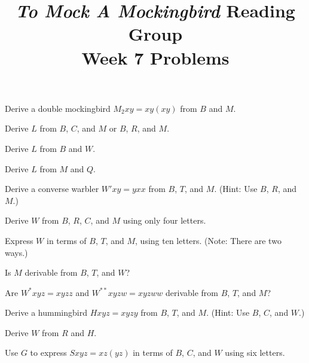 \documentclass[12pt, letterpaper]{article}
\title{\emph{To Mock A Mockingbird} Reading Group\\Week 7 Problems}
\begin{document}
\maketitle

\begin{prob}{12.1}   
Derive a double mockingbird $M_2xy = xy(xy)$ from $B$ and $M$.
\end{prob}

\begin{prob}{12.2}   
Derive $L$ from $B$, $C$, and $M$ or $B$, $R$, and $M$.
\end{prob}

\begin{prob}{12.3}   
Derive $L$ from $B$ and $W$.
\end{prob}

\begin{prob}{12.4}   
Derive $L$ from $M$ and $Q$.
\end{prob}

\begin{prob}{12.5}   
Derive a converse warbler $W'xy = yxx$ from $B$, $T$, and $M$. (Hint: Use $B$, $R$, and $M$.)
\end{prob}

\begin{prob}{12.6}   
Derive $W$ from $B$, $R$, $C$, and $M$ using only four letters.
\end{prob}

\begin{prob}{12.7}   
Express $W$ in terms of $B$, $T$, and $M$, using ten letters. (Note: There are two ways.)
\end{prob}

\begin{prob}{12.8}   
Is $M$ derivable from $B$, $T$, and $W$?
\end{prob}

\begin{prob}{12.9}   
Are $W^*xyz = xyzz$ and $W^{**}xyzw = xyzww$ derivable from $B$, $T$, and $M$?
\end{prob}

\begin{prob}{12.10}  
Derive a hummingbird $Hxyz = xyzy$ from $B$, $T$, and $M$. (Hint: Use $B$, $C$, and $W$.)
\end{prob}

\begin{prob}{12.11}  
Derive $W$ from $R$ and $H$.
\end{prob}

\begin{prob}{12.12}  
Use $G$ to express $Sxyz = xz(yz)$ in terms of $B$, $C$, and $W$ using six letters.
\end{prob}
\end{document}
